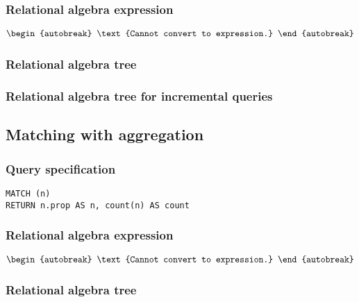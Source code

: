\subsubsection*{Relational algebra expression}

\begin{align*}
\begin{autobreak}
\text{Cannot convert to expression.}
\end{autobreak}
\end{align*}

\subsubsection*{Relational algebra tree}


\subsubsection*{Relational algebra tree for incremental queries}


\subsection{Matching with aggregation}

\subsubsection*{Query specification}

\begin{lstlisting}
MATCH (n)
RETURN n.prop AS n, count(n) AS count
\end{lstlisting}

\subsubsection*{Relational algebra expression}

\begin{align*}
\begin{autobreak}
\text{Cannot convert to expression.}
\end{autobreak}
\end{align*}

\subsubsection*{Relational algebra tree}

